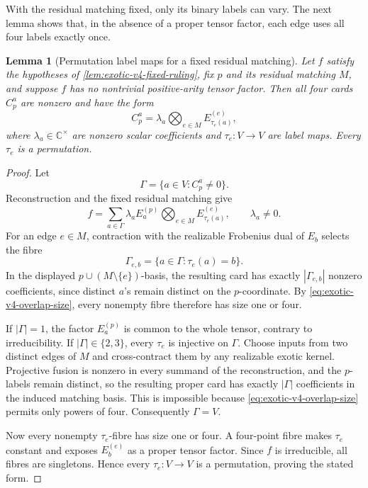 \documentclass[11pt,letterpaper,onecolumn]{article}
\theoremstyle{plain}
\newtheorem{lemma}[lemma]{Lemma}
\theoremstyle{definition}
\theoremstyle{remark}
\begin{document}
With the residual matching fixed, only its binary labels can vary.
The next lemma shows that, in the absence of a proper tensor factor,
each edge uses all four labels exactly once.

\begin{lemma}[Permutation label maps for a fixed residual matching]
\label{lem:exotic-v4-fiber-dichotomy}
Let \(f\) satisfy the hypotheses of \cref{lem:exotic-v4-fixed-ruling}, fix \(p\) and its
residual matching \(M\), and suppose \(f\) has no nontrivial
positive-arity tensor factor.  Then
all four cards \(C_p^a\) are nonzero and have the form
\begin{equation*}
 C_p^a=\lambda_a\bigotimes_{e\in M}E_{\tau_e(a)}^{(e)},
\end{equation*}
where \(\lambda_a\in\mathbb C^\times\) are nonzero scalar coefficients and
\(\tau_e:V\to V\) are label maps. Every \(\tau_e\) is a permutation.
\end{lemma}

\begin{proof}
Let
\[
 \Gamma=\{a\in V:C_p^a\ne0\}.
\]
Reconstruction and the fixed residual matching give
\[
 f=\sum_{a\in\Gamma}\lambda_a E_a^{(p)}
      \bigotimes_{e\in M}E_{\tau_e(a)}^{(e)},
 \qquad \lambda_a\ne0.
\]
For an edge \(e\in M\), contraction with the realizable Frobenius dual of
\(E_b\) selects the fibre
\[
 \Gamma_{e,b}=\{a\in\Gamma:\tau_e(a)=b\}.
\]
In the displayed \(p\cup(M\setminus\{e\})\)-basis, the resulting card has
exactly \(|\Gamma_{e,b}|\) nonzero coefficients, since distinct \(a\)'s
remain distinct on the \(p\)-coordinate.  By
\cref{eq:exotic-v4-overlap-size}, every nonempty fibre therefore has size
one or four.

If \(|\Gamma|=1\), the factor \(E_a^{(p)}\) is common to the whole tensor,
contrary to irreducibility.  If \(|\Gamma|\in\{2,3\}\), every
\(\tau_e\) is injective on \(\Gamma\).  Choose inputs from two distinct
edges of \(M\) and cross-contract them by any realizable exotic kernel.
Projective fusion is nonzero in every summand of the reconstruction, and the \(p\)-labels remain
distinct, so the resulting proper card has exactly \(|\Gamma|\)
coefficients in the induced matching basis.  This is impossible because
\cref{eq:exotic-v4-overlap-size} permits only powers of four.  Consequently
\(\Gamma=V\).

Now every nonempty \(\tau_e\)-fibre has size one or four.  A four-point
fibre makes \(\tau_e\) constant and exposes \(E_b^{(e)}\) as a proper tensor
factor.  Since \(f\) is irreducible, all fibres are singletons.  Hence every
\(\tau_e:V\to V\) is a permutation, proving the stated form.
\end{proof}
\end{document}
